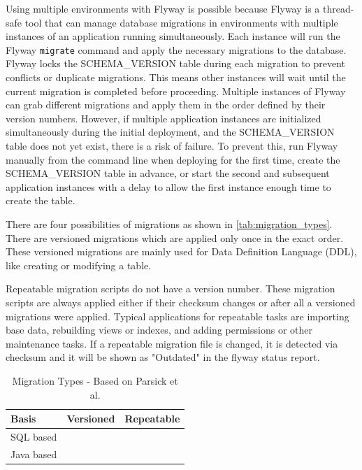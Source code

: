Using multiple environments with Flyway is possible because Flyway is a thread-safe tool that can manage database migrations in environments with multiple instances of an application running simultaneously. Each instance will run the Flyway \texttt{migrate} command and apply the necessary migrations to the database. Flyway locks the SCHEMA\_VERSION table during each migration to prevent conflicts or duplicate migrations. This means other instances will wait until the current migration is completed before proceeding. Multiple instances of Flyway can grab different migrations and apply them in the order defined by their version numbers. However, if multiple application instances are initialized simultaneously during the initial deployment, and the SCHEMA\_VERSION table does not yet exist, there is a risk of failure. To prevent this, run Flyway manually from the command line when deploying for the first time, create the SCHEMA\_VERSION table in advance, or start the second and subsequent application instances with a delay to allow the first instance enough time to create the table.

%
There are four possibilities of migrations as shown in \autoref{tab:migration_types}. There are versioned migrations which are applied only once in the exact order. These versioned migrations are mainly used for Data Definition Language (DDL), like creating or modifying a table.

Repeatable migration scripts do not have a version number. These migration scripts are always applied either if their checksum changes or after all a versioned migrations were applied. Typical applications for repeatable tasks are importing base data, rebuilding views or indexes, and adding permissions or other maintenance tasks. If a repeatable migration file is changed, it is detected via checksum and it will be shown as "Outdated" in the flyway status report.

\begin{table}[H]
	\centering
	\begin{tabularx}{8cm}{X c c}
		Basis & Versioned & Repeatable \\ \toprule
		SQL based & \checkmark & \checkmark \\
		Java based & \checkmark & \checkmark \\
	\end{tabularx}
	\caption{Migration Types - Based on Parsick et al. \cite{Parsick2018}}
	\label{tab:migration_types}
\end{table}

